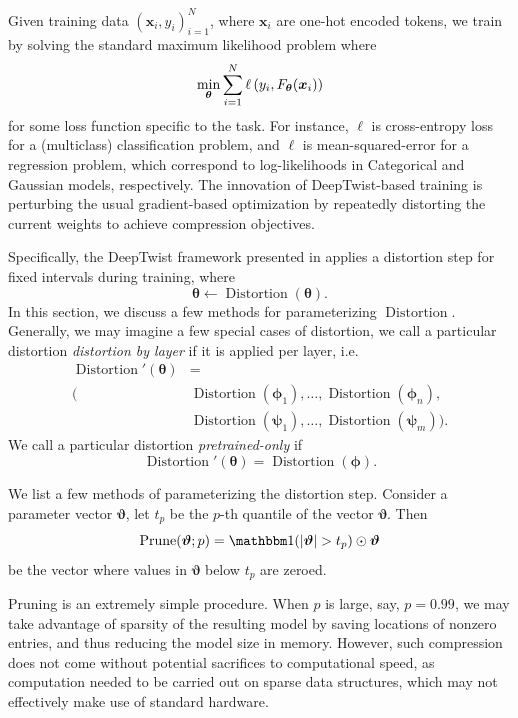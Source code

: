 \documentclass[10pt]{article}
\newcommand{\distortion}{\operatorname{Distortion}}
\newcommand{\prune}{\operatorname{Prune}}
\newcommand{\btheta}{{\bm{\theta}}}
\newcommand{\bphi}{{\bm{\phi}}}
\newcommand{\bpsi}{{\bm{\psi}}}
\newcommand{\bvartheta}{{\bm{\vartheta}}}
\begin{document}


Given training data $(\bm x_i, y_i)_{i=1}^N$, where $\bm x_i$ are one-hot
encoded tokens, we train by solving the standard maximum likelihood problem
where \[
\min_{\btheta} \sum_{i=1}^N \ell\pr{y_i, F_\btheta(\bm x_i)}
\]
for some loss function specific to the task. For instance, $\ell$ is
cross-entropy loss for a (multiclass) classification problem, and $\ell$ is
mean-squared-error for a regression problem, which correspond to
log-likelihoods in Categorical and Gaussian models, respectively. The
innovation of DeepTwist-based training is perturbing the usual gradient-based
optimization by repeatedly distorting the current weights to achieve
compression objectives.

Specifically, the DeepTwist framework presented in  applies
a distortion step for fixed intervals during training, where \[
\btheta \gets \distortion(\btheta). 
\]
In this section, we discuss a few methods for parameterizing $\distortion$.
Generally, we may imagine a few special cases of distortion, we call a
particular distortion \emph{distortion by layer} if it is applied per layer,
i.e. \begin{align*}
\distortion'(\btheta) &= \\
(&\distortion(\bphi_1),\ldots,\distortion(\bphi_n),\\
&\distortion(\bpsi_1),\ldots, \distortion(\bpsi_m)).
\end{align*}
We call a particular distortion \emph{pretrained-only} if \[
\distortion'(\btheta) = \distortion(\bphi).
\]

We list a few methods of parameterizing the distortion step. 
 Consider a parameter vector $\bvartheta$, let
  $t_p$ be the $p$-th quantile of the vector $\bvartheta$. Then \[
  \prune(\bvartheta; p) = \one(|\bvartheta| > t_p) \odot \bvartheta
  \]
  be the vector where values in $\bvartheta$ below $t_p$ are zeroed. 
  
  Pruning is an extremely simple procedure. When $p$ is large, say, $p=0.99$,
  we may take advantage of sparsity of the resulting model by saving locations
  of nonzero entries, and thus reducing the model size in memory. However,
  such compression does not come without potential sacrifices to computational
  speed, as computation needed to be carried out on sparse data structures,
  which may not effectively make use of standard hardware.
  
\end{document}
